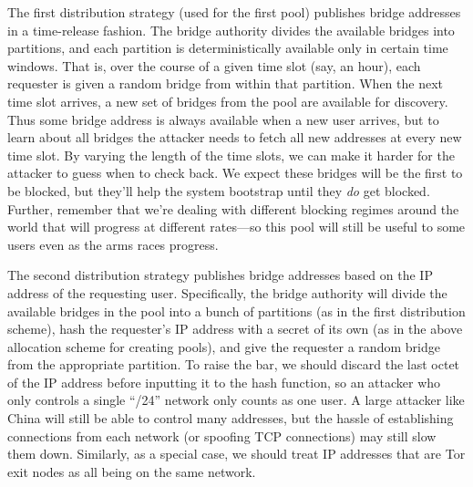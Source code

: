 \documentclass{llncs}
\begin{document}
%

The first distribution strategy (used for the first pool) publishes bridge
addresses in a time-release fashion. The bridge authority divides the
available bridges into partitions, and each partition is deterministically
available only in certain time windows. That is, over the course of a
given time slot (say, an hour), each requester is given a random bridge
from within that partition. When the next time slot arrives, a new set
of bridges from the pool are available for discovery. Thus some bridge
address is always available when a new
user arrives, but to learn about all bridges the attacker needs to fetch
all new addresses at every new time slot. By varying the length of the
time slots, we can make it harder for the attacker to guess when to check
back. We expect these bridges will be the first to be blocked, but they'll
help the system bootstrap until they \emph{do} get blocked. Further,
remember that we're dealing with different blocking regimes around the
world that will progress at different rates---so this pool will still
be useful to some users even as the arms races progress.

The second distribution strategy publishes bridge addresses based on the IP
address of the requesting user. Specifically, the bridge authority will
divide the available bridges in the pool into a bunch of partitions
(as in the first distribution scheme), hash the requester's IP address
with a secret of its own (as in the above allocation scheme for creating
pools), and give the requester a random bridge from the appropriate
partition. To raise the bar, we should discard the last octet of the
IP address before inputting it to the hash function, so an attacker
who only controls a single ``/24'' network only counts as one user. A
large attacker like China will still be able to control many addresses,
but the hassle of establishing connections from each network (or spoofing
TCP connections) may still slow them down. Similarly, as a special case,
we should treat IP addresses that are Tor exit nodes as all being on
the same network.
\end{document}
